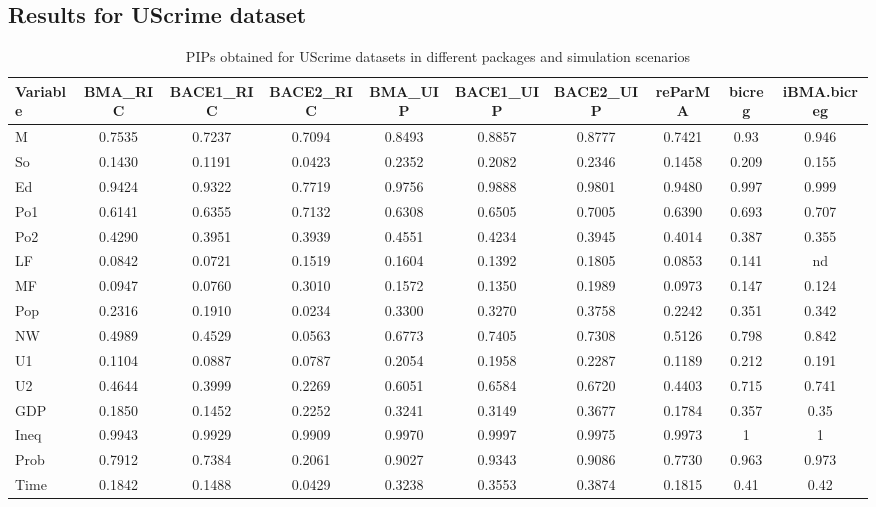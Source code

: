 \subsection{Results for UScrime dataset}

\begin{landscape}
	\begin{table}	
		\centering\small
		\begin{tabular}{lccccccccc}\hline\hline
			Variable	&	BMA\_RIC	&	BACE1\_RIC	&	BACE2\_RIC	&	BMA\_UIP	&	BACE1\_UIP	&	BACE2\_UIP	&	reParMA	&	bicreg	&	iBMA.bicreg	\\\hline
			M	&	0.7535	&	0.7237	&	0.7094	&	0.8493	&	0.8857	&	0.8777	&	0.7421	&	0.93	&	0.946	\\
			So	&	0.1430	&	0.1191	&	0.0423	&	0.2352	&	0.2082	&	0.2346	&	0.1458	&	0.209	&	0.155	\\
			Ed	&	0.9424	&	0.9322	&	0.7719	&	0.9756	&	0.9888	&	0.9801	&	0.9480	&	0.997	&	0.999	\\
			Po1	&	0.6141	&	0.6355	&	0.7132	&	0.6308	&	0.6505	&	0.7005	&	0.6390	&	0.693	&	0.707	\\
			Po2	&	0.4290	&	0.3951	&	0.3939	&	0.4551	&	0.4234	&	0.3945	&	0.4014	&	0.387	&	0.355	\\
			LF	&	0.0842	&	0.0721	&	0.1519	&	0.1604	&	0.1392	&	0.1805	&	0.0853	&	0.141	&	nd	\\
			MF	&	0.0947	&	0.0760	&	0.3010	&	0.1572	&	0.1350	&	0.1989	&	0.0973	&	0.147	&	0.124	\\
			Pop	&	0.2316	&	0.1910	&	0.0234	&	0.3300	&	0.3270	&	0.3758	&	0.2242	&	0.351	&	0.342	\\
			NW	&	0.4989	&	0.4529	&	0.0563	&	0.6773	&	0.7405	&	0.7308	&	0.5126	&	0.798	&	0.842	\\
			U1	&	0.1104	&	0.0887	&	0.0787	&	0.2054	&	0.1958	&	0.2287	&	0.1189	&	0.212	&	0.191	\\
			U2	&	0.4644	&	0.3999	&	0.2269	&	0.6051	&	0.6584	&	0.6720	&	0.4403	&	0.715	&	0.741	\\
			GDP	&	0.1850	&	0.1452	&	0.2252	&	0.3241	&	0.3149	&	0.3677	&	0.1784	&	0.357	&	0.35	\\
			Ineq	&	0.9943	&	0.9929	&	0.9909	&	0.9970	&	0.9997	&	0.9975	&	0.9973	&	1	&	1	\\
			Prob	&	0.7912	&	0.7384	&	0.2061	&	0.9027	&	0.9343	&	0.9086	&	0.7730	&	0.963	&	0.973	\\
			Time	&	0.1842	&	0.1488	&	0.0429	&	0.3238	&	0.3553	&	0.3874	&	0.1815	&	0.41	&	0.42	\\\hline
		\end{tabular}
		\caption{PIPs obtained for UScrime datasets in different packages and simulation scenarios}
	\end{table}
\end{landscape}


